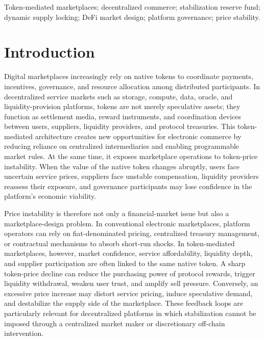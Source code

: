 \documentclass[a4paper,fleqn]{cas-dc}
\begin{document}


\begin{keywords}
Token-mediated marketplaces; decentralized commerce; stabilization reserve fund; dynamic supply locking; DeFi market design; platform governance; price stability.

\end{keywords}


\maketitle
\section{Introduction}
\label{sec:introduction}

Digital marketplaces increasingly rely on native tokens to coordinate payments, incentives, governance, and resource allocation among distributed participants. In decentralized service markets such as storage, compute, data, oracle, and liquidity-provision platforms, tokens are not merely speculative assets; they function as settlement media, reward instruments, and coordination devices between users, suppliers, liquidity providers, and protocol treasuries. This token-mediated architecture creates new opportunities for electronic commerce by reducing reliance on centralized intermediaries and enabling programmable market rules. At the same time, it exposes marketplace operations to token-price instability. When the value of the native token changes abruptly, users face uncertain service prices, suppliers face unstable compensation, liquidity providers reassess their exposure, and governance participants may lose confidence in the platform's economic viability.

Price instability is therefore not only a financial-market issue but also a marketplace-design problem. In conventional electronic marketplaces, platform operators can rely on fiat-denominated pricing, centralized treasury management, or contractual mechanisms to absorb short-run shocks. In token-mediated marketplaces, however, market confidence, service affordability, liquidity depth, and supplier participation are often linked to the same native token. A sharp token-price decline can reduce the purchasing power of protocol rewards, trigger liquidity withdrawal, weaken user trust, and amplify sell pressure. Conversely, an excessive price increase may distort service pricing, induce speculative demand, and destabilize the supply side of the marketplace. These feedback loops are particularly relevant for decentralized platforms in which stabilization cannot be imposed through a centralized market maker or discretionary off-chain intervention.
\end{document}
